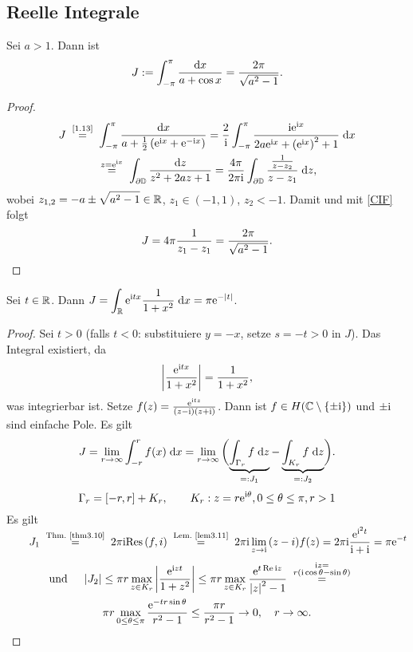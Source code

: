 \documentclass[a4paper,twoside,DIV15,BCOR12mm]{scrbook}
\begin{document}
\subsection*{Reelle Integrale}

\begin{bsp}\label{bsp3.13}
  Sei $a>1$. Dann ist \[ J := \int_{-\pi}^\pi{\frac{\mathrm{d}x}{a+\cos{x}}} = \frac{2\pi}{\sqrt{a^2-1}}. \]
\end{bsp}
\begin{proof}
  \begin{multline*}
    J \nach{=}{\eqref{1.13}} \int_{-\pi}^\pi{\frac{\d x}{a+\frac12\left(\e^{\i x}+\e^{-\i x}\right)}} =
    \frac2\i \integral{-\pi}{\pi}{\frac{\i\e^{\i x}}{2a\e^{\i x}+\left(\e^{\i x}\right)^2+1}}{x} \\
    \wegen{=}{z=\e^{\i x}} \int_{\partial\mathbb{D}}{\frac{\d z}{z^2+2az+1}}
    = \frac{4\pi}{2\pi\i} \integral{\partial\mathbb{D}}{}{\frac{\frac{1}{z-z_2}}{z-z_1}}{z},
  \end{multline*}
  wobei $\displaystyle z_{1,2} = -a \pm \sqrt{a^2-1} \in \mathbb{R}$, $z_1\in(-1,1)$, $z_2<-1$. Damit und mit \eqref{CIF} folgt
  \[ J = 4\pi \frac{1}{z_1-z_1} =  \frac{2\pi}{\sqrt{a^2-1}}. \qedhere \]
\end{proof}

\begin{bsp}\label{bsp3.14}
  Sei $t\in\mathbb{R}$. Dann $\displaystyle J=\int_{\mathbb{R}}^{}{\mathrm{e}^{\mathrm{i} tx} \frac{1}{1+x^2}}\;\mathrm{d} x = \pi\mathrm{e}^{-\left\lvert t\right\lvert}$.
\end{bsp}
\begin{proof}
  Sei $t>0$ (falls $t<0$: substituiere $y=-x$, setze $s=-t>0$ in $J$). Das Integral existiert, da
  \[ \left\lvert\frac{\mathrm{e}^{\mathrm{i} tx}}{1+x^2}\right\lvert = \frac{1}{1+x^2}, \]
  was integrierbar ist. Setze $f(z) = \frac{\mathrm{e}^{\mathrm{i} tz}}{(z-\mathrm{i})(z+\mathrm{i})}$. Dann ist $f\in H(\mathbb{C}\setminus\{\pm\mathrm{i}\})$ und $\pm\mathrm{i}$ sind
  einfache Pole. Es gilt
  \[ J = \lim_{r\to\infty}{\int_{-r}^{r}{f(x)}\;\mathrm{d} x} = \lim_{r\to\infty}{\biggl(\underbrace{\int_{\Gamma_r}^{}{f}\;\mathrm{d} z}_{=: J_1} -
      \underbrace{\int_{K_r}^{}{f}\;\mathrm{d} z}_{=: J_2}\biggr)}. \]
  \[ \Gamma_r = [-r,r] + K_r, \qquad K_r : z = r\mathrm{e}^{\mathrm{i}\theta}, 0\leq\theta\leq\pi, r>1 \]
  Es gilt $\displaystyle \qquad
  J_1 \nach{=}{Thm.~\ref{thm3.10}} 2\pi\i\Res{f}{i} \nach{=}{Lem.~\ref{lem3.11}} 2\pi\i \lim_{z\to\i}{(z-i)f(z)} = 2\pi\i
  \frac{\e^{\i^2t}}{\i+\i} = \pi\e^{-t}$
  \begin{multline*}
    \!\!\!\!\!\!\text{und } \quad
    \abs{J_2} \leq \pi r \max_{z\in K_r}{\abs{\frac{\e^{\i zt}}{1+z^2}}} \leq \pi r \max_{z\in K_r}{\frac{\e^{t\Re{\i
            z}}}{\abs{z}^2-1}} \wegen{=}{\substack{\i z =\\r(\i\cos{\theta}-\sin{\theta})}} \\
    \pi r \max_{0\le\theta\le\pi}{\frac{\e^{-tr\sin{\theta}}}{r^2-1}} \leq \frac{\pi r}{r^2-1} \to 0, \quad r\to\infty. \qedhere
  \end{multline*}
\end{proof}
\end{document}
